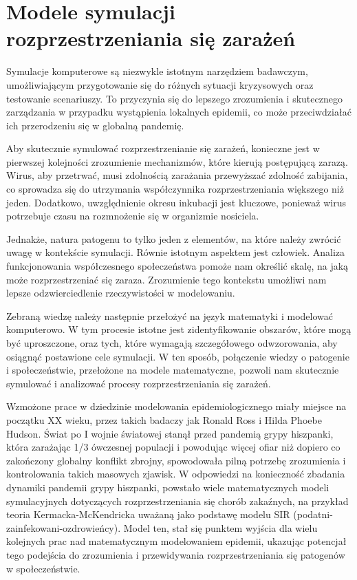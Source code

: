 \chapter{Modele symulacji rozprzestrzeniania się zarażeń}
Symulacje komputerowe są niezwykle istotnym narzędziem badawczym, umożliwiającym przygotowanie się do różnych sytuacji kryzysowych oraz testowanie scenariuszy. To przyczynia się do lepszego zrozumienia i skutecznego zarządzania w przypadku wystąpienia lokalnych epidemii, co może przeciwdziałać ich przerodzeniu się w globalną pandemię.

Aby skutecznie symulować rozprzestrzenianie się zarażeń, konieczne jest w pierwszej kolejności zrozumienie mechanizmów, które kierują postępującą zarazą. Wirus, aby przetrwać, musi zdolnością zarażania przewyższać zdolność zabijania, co sprowadza się do utrzymania współczynnika rozprzestrzeniania większego niż jeden. Dodatkowo, uwzględnienie okresu inkubacji jest kluczowe, ponieważ wirus potrzebuje czasu na rozmnożenie się w organizmie nosiciela.

Jednakże, natura patogenu to tylko jeden z elementów, na które należy zwrócić uwagę w kontekście symulacji. Równie istotnym aspektem jest człowiek. Analiza funkcjonowania współczesnego społeczeństwa pomoże nam określić skalę, na jaką może rozprzestrzeniać się zaraza. Zrozumienie tego kontekstu umożliwi nam lepsze odzwierciedlenie rzeczywistości w modelowaniu.

Zebraną wiedzę należy następnie przełożyć na język matematyki i modelować komputerowo. W tym procesie istotne jest zidentyfikowanie obszarów, które mogą być uproszczone, oraz tych, które wymagają szczegółowego odwzorowania, aby osiągnąć postawione cele symulacji. W ten sposób, połączenie wiedzy o patogenie i społeczeństwie, przełożone na modele matematyczne, pozwoli nam skutecznie symulować i analizować procesy rozprzestrzeniania się zarażeń. 

Wzmożone prace w dziedzinie modelowania epidemiologicznego miały miejsce na początku XX wieku, przez takich badaczy jak Ronald Ross\cite{bib:RossRonald} i Hilda Phoebe Hudson\cite{bib:RossHudson}\cite{bib:RossHudson2}. Świat po I wojnie światowej stanął przed pandemią grypy hiszpanki, która zarażając 1/3 ówczesnej populacji i powodując więcej ofiar niż dopiero co zakończony globalny konflikt zbrojny\cite{bib:cdc1918pandemic}, spowodowała pilną potrzebę zrozumienia i kontrolowania takich masowych zjawisk. W odpowiedzi na konieczność zbadania dynamiki pandemii grypy hiszpanki, powstało wiele matematycznych modeli symulacyjnych dotyczących rozprzestrzeniania się chorób zakaźnych, na przykład teoria Kermacka-McKendricka\cite{bib:Kermack} uważaną jako podstawę modelu SIR (podatni-zainfekowani-ozdrowieńcy). Model ten, stał się punktem wyjścia dla wielu kolejnych prac nad matematycznym modelowaniem epidemii, ukazując potencjał tego podejścia do zrozumienia i przewidywania rozprzestrzeniania się patogenów w społeczeństwie.

